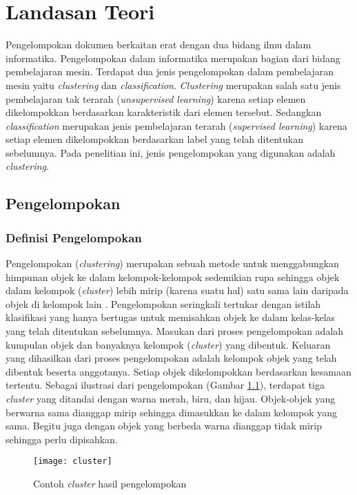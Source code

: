 \chapter{Landasan Teori}
\label{chap:teori}

Pengelompokan dokumen berkaitan erat dengan dua bidang ilmu dalam informatika. Pengelompokan dalam informatika merupakan bagian dari bidang pembelajaran mesin. Terdapat dua jenis pengelompokan dalam pembelajaran mesin yaitu \textit{clustering} dan \textit{classification}. \textit{Clustering} merupakan salah satu jenis pembelajaran tak terarah (\textit{unsupervised learning}) karena setiap elemen dikelompokkan berdasarkan karakteristik dari elemen tersebut. Sedangkan \textit{classification} merupakan jenis pembelajaran terarah (\textit{supervised learning}) karena setiap elemen dikelompokkan berdasarkan label yang telah ditentukan sebelumnya. Pada penelitian ini, jenis pengelompokan yang digunakan adalah \textit{clustering}.

\section{Pengelompokan}
\subsection{Definisi Pengelompokan}
Pengelompokan (\textit{clustering}) merupakan sebuah metode untuk menggabungkan himpunan objek ke dalam kelompok-kelompok sedemikian rupa sehingga objek dalam kelompok (\textit{cluster}) lebih mirip (karena suatu hal) satu sama lain daripada objek di kelompok lain \cite{gan2007data}. Pengelompokan seringkali tertukar dengan istilah klasifikasi yang hanya bertugas untuk memisahkan objek ke dalam kelas-kelas yang telah ditentukan sebelumnya. Masukan dari proses pengelompokan adalah kumpulan objek dan banyaknya kelompok (\textit{cluster}) yang dibentuk. Keluaran yang dihasilkan dari proses pengelompokan adalah kelompok objek yang telah dibentuk beserta anggotanya. Setiap objek dikelompokkan berdasarkan kesamaan tertentu. Sebagai ilustrasi dari pengelompokan (Gambar \ref{fig:cluster}), terdapat tiga \textit{cluster} yang ditandai dengan warna merah, biru, dan hijau. Objek-objek yang berwarna sama dianggap mirip sehingga dimasukkan ke dalam kelompok yang sama. Begitu juga dengan objek yang berbeda warna dianggap tidak mirip sehingga perlu dipisahkan.

\begin{figure}[h]
	\begin{center}
		\texttt{[image: cluster]}
		\caption{Contoh \textit{cluster} hasil pengelompokan}
		\label{fig:cluster}
	\end{center}
\end{figure}

